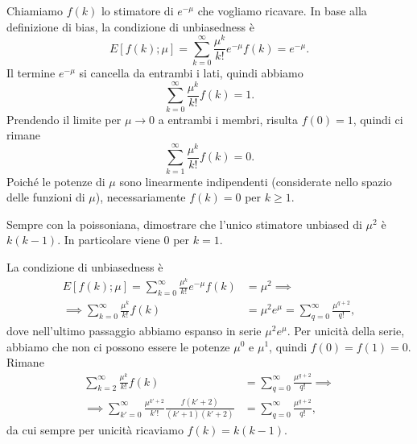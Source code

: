 \begin{solution}
    Chiamiamo $f(k)$ lo stimatore di $e^{-\mu}$ che vogliamo ricavare. In base
    alla definizione di bias, la condizione di unbiasedness è
    \begin{equation*}
        E[f(k);\mu]
        = \sum_{k=0}^\infty \frac{\mu^k}{k!}e^{-\mu} f(k)
        = e^{-\mu}.
    \end{equation*}
    Il termine $e^{-\mu}$ si cancella da entrambi i lati, quindi abbiamo
    \begin{equation*}
        \sum_{k=0}^\infty \frac{\mu^k}{k!} f(k)  =  1.
    \end{equation*}
    Prendendo il limite per $\mu \to 0$ a entrambi i membri, risulta
    $f(0) = 1$, quindi ci rimane
    \begin{equation*}
        \sum_{k=1}^\infty \frac{\mu^k}{k!} f(k) = 0.
    \end{equation*}
    Poiché le potenze di $\mu$ sono linearmente indipendenti (considerate nello
    spazio delle funzioni di $\mu$), necessariamente $f(k) = 0$ per $k \ge 1$.
\end{solution}

\begin{exercise}
    Sempre con la poissoniana, dimostrare che l'unico stimatore unbiased di
    $\mu^2$ è $k(k-1)$. In particolare viene 0 per $k = 1$.
\end{exercise}

\begin{solution}
    La condizione di unbiasedness è
    \begin{align*}
        E[f(k);\mu]
        = \sum_{k=0}^\infty \frac{\mu^k}{k!}e^{-\mu} f(k)
        &= \mu^2 \implies \\
        \implies
        \sum_{k=0}^\infty \frac{\mu^k}{k!} f(k)
        &= \mu^2 e^\mu
        = \sum_{q=0}^\infty \frac{\mu^{q+2}}{q!},
    \end{align*}
    dove nell'ultimo passaggio abbiamo espanso in serie $\mu^2e^\mu$.
    Per unicità della serie, abbiamo che non ci possono essere le potenze
    $\mu^0$ e $\mu^1$, quindi $f(0) = f(1) = 0$. Rimane
    \begin{align*}
        \sum_{k=2}^\infty \frac{\mu^k}{k!} f(k)
        &= \sum_{q=0}^\infty \frac{\mu^{q+2}}{q!} \implies \\
        \implies
        \sum_{k'=0}^\infty \frac{\mu^{k'+2}}{k'!} \frac{f(k'+2)}{(k'+1)(k'+2)}
        &= \sum_{q=0}^\infty \frac{\mu^{q+2}}{q!},
    \end{align*}
    da cui sempre per unicità ricaviamo $f(k) = k(k-1)$.
\end{solution}


